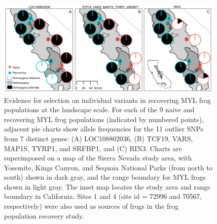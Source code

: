 \documentclass[9pt,twocolumn,twoside,lineno]{pnas-new}
\begin{document}
\begin{figure}

{\centering \includegraphics[width=\textwidth]{figures/allele_maps.png}

}

\caption{\label{fig-allelefrequencies}Evidence for selection on
individual variants in recovering MYL frog populations at the landscape
scale. For each of the 9 naive and recovering MYL frog populations
(indicated by numbered points), adjacent pie charts show allele
frequencies for the 11 outlier SNPs from 7 distinct genes: (A)
LOC108802036, (B) TCF19, VARS, MAP1S, TYRP1, and SRFBP1, and (C) RIN3.
Charts are superimposed on a map of the Sierra Nevada study area, with
Yosemite, Kings Canyon, and Sequoia National Parks (from north to south)
shown in dark gray, and the range boundary for MYL frogs shown in light
gray. The inset map locates the study area and range boundary in
California. Sites 1 and 4 (site id = 72996 and 70567, respectively) were
also used as sources of frogs in the frog population recovery study.}

\end{figure}

\newpage
\end{document}
